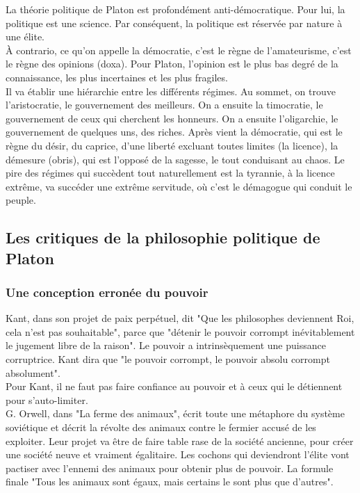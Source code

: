 \documentclass[10pt, a4paper, openany]{book}
\begin{document}
La théorie politique de Platon est profondément anti-démocratique. Pour lui, la politique est une science. Par conséquent, la politique est réservée par nature à une élite. \\
À contrario, ce qu'on appelle la démocratie, c'est le règne de l'amateurisme, c'est le règne des opinions (doxa). Pour Platon, l'opinion est le plus bas degré de la connaissance, les plus incertaines et les plus fragiles. \\
Il va établir une hiérarchie entre les différents régimes. Au sommet, on trouve l'aristocratie, le gouvernement des meilleurs. On a ensuite la timocratie, le gouvernement de ceux qui cherchent les honneurs. On a ensuite l'oligarchie, le gouvernement de quelques uns, des riches. Après vient la démocratie, qui est le règne du désir, du caprice, d'une liberté excluant toutes limites (la licence), la démesure (obris), qui est l'opposé de la sagesse, le tout conduisant au chaos. Le pire des régimes qui succèdent tout naturellement est la tyrannie, à la licence extrême, va succéder une extrême servitude, où c'est le démagogue qui conduit le peuple.

\subsection{Les critiques de la philosophie politique de Platon}

\subsubsection{Une conception erronée du pouvoir}

Kant, dans son projet de paix perpétuel, dit "Que les philosophes deviennent Roi, cela n'est pas souhaitable", parce que "détenir le pouvoir corrompt inévitablement le jugement libre de la raison". Le pouvoir a intrinsèquement une puissance corruptrice. Kant dira que "le pouvoir corrompt, le pouvoir absolu corrompt absolument". \\
Pour Kant, il ne faut pas faire confiance au pouvoir et à ceux qui le détiennent pour s'auto-limiter. \\
G. Orwell, dans "La ferme des animaux", écrit toute une métaphore du système soviétique et décrit la révolte des animaux contre le fermier accusé de les exploiter. Leur projet va être de faire table rase de la société ancienne, pour créer une société neuve et vraiment égalitaire. Les cochons qui deviendront l'élite vont pactiser avec l'ennemi des animaux pour obtenir plus de pouvoir. La formule finale "Tous les animaux sont égaux, mais certains le sont plus que d'autres". 
\end{document}
